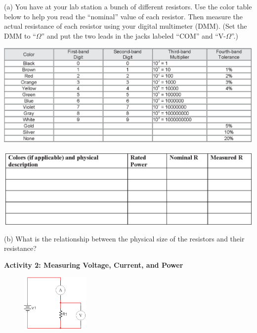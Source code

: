 (a) You have at your lab station a bunch of different resistors.  Use the color table below to help you read the ``nominal'' value of each resistor.  Then measure the actual resistance of each resistor using your digital multimeter (DMM).  (Set the DMM to ``$\Omega$'' and put the two leads in the jacks labeled ``COM'' and ``V-$\Omega$''.)

\begin{center}
\includegraphics[width=1.0\textwidth]{electric_power/color_code.eps}

\vspace{0.2in}
\includegraphics[width=1.0\textwidth]{electric_power/resistor_description.eps}
\end{center}

(b) What is the relationship between the physical size of the resistors and their resistance?
\vspace{1.0in}

\pagebreak
\textbf{Activity 2: Measuring Voltage, Current, and Power}

\begin{figure}
    \vspace{-0.4 in}
    \includegraphics[width=0.3\textwidth]{electric_power/circ_diagram.eps}
\end{figure}

